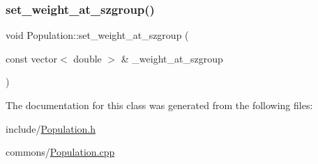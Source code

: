 \subsubsection{\texorpdfstring{set\_weight\_at\_szgroup()}{set\_weight\_at\_szgroup()}}
{\footnotesize\ttfamily void Population\+::set\+\_\+weight\+\_\+at\+\_\+szgroup (\begin{DoxyParamCaption}\item[{const vector$<$ double $>$ \&}]{\+\_\+weight\+\_\+at\+\_\+szgroup }\end{DoxyParamCaption})}



The documentation for this class was generated from the following files\+:\begin{DoxyCompactItemize}
\item 
include/\mbox{\hyperlink{_population_8h}{Population.\+h}}\item 
commons/\mbox{\hyperlink{_population_8cpp}{Population.\+cpp}}\end{DoxyCompactItemize}
